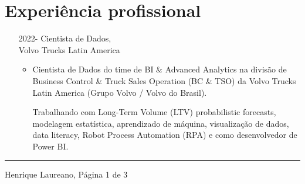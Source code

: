 \documentclass[12pt]{article}
\newcommand{\horrule}[1]{\noindent\rule{\linewidth}{#1}}
\begin{document}
\vspace{-0.5cm}
\section*{Experi\^{e}ncia profissional}

\begin{itemize}
 \item[2022-] Cientista de Dados,\\
              Volvo Trucks Latin America
  \begin{itemize}
  \item Cientista de Dados do time de BI \& Advanced Analytics na
        divis\~{a}o de Business Control \& Truck Sales Operation (BC \&
        TSO) da Volvo Trucks Latin America (Grupo Volvo / Volvo do
        Brasil).
        
        Trabalhando com Long-Term Volume (LTV) probabilistic forecasts, modelagem
        estat\'{i}stica, aprendizado de m\'{a}quina, visualiza\c{c}\~{a}o de 
        dados, data literacy, Robot Process Automation (RPA) e como desenvolvedor
        de Power BI.
  \end{itemize}
\end{itemize}

\vspace{\fill}
\horrule{1pt}
\noindent Henrique Laureano, \hfill P\'{a}gina 1 de 3
\end{document}

